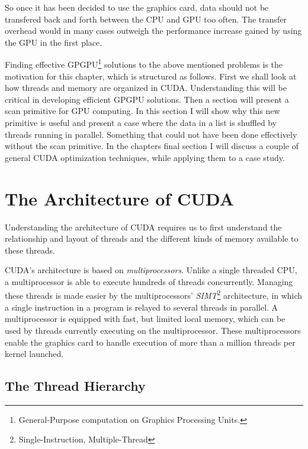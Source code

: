 So once it has been decided to use the graphics card, data should not be
transfered back and forth between the CPU and GPU too often. The transfer
overhead would in many cases outweigh the performance increase gained by using
the GPU in the first place.




Finding effective GPGPU\footnote{General-Purpose computation on Graphics
  Processing Units.} solutions to the above mentioned problems is the motivation
for this chapter, which is structured as follows. First we shall look at how
threads and memory are organized in CUDA. Understanding this will be critical in
developing efficient GPGPU solutions. Then a section will present a scan
primitive for GPU computing. In this section I will show why this new primitive
is useful and present a case where the data in a list is shuffled by threads
running in parallel. Something that could not have been done effectively without
the scan primitive. In the chapters final section I will discuss a couple of
general CUDA optimization techniques, while applying them to a case study.

\section{The Architecture of CUDA}

Understanding the architecture of CUDA requires us to first understand the
relationship and layout of threads and the different kinds of memory available
to these threads.

CUDA's architecture is based on \textit{multiprocessors}. Unlike a single
threaded CPU, a multiprocessor is able to execute hundreds of threads
concurrently. Managing these threads is made easier by the multiprocessors'
\textit{SIMT}\footnote{Single-Instruction, Multiple-Thread} architecture, in
which a single instruction in a program is relayed to several threads in
parallel. A multiprocessor is equipped with fast, but limited local memory,
which can be used by threads currently executing on the multiprocessor. These
multiprocessors enable the graphics card to handle execution of more than a
million threads per kernel launched.


\subsection{The Thread Hierarchy}\label{sec:threadHierarchy}

